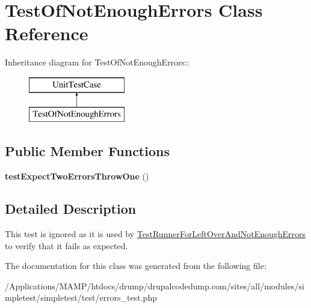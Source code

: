 \hypertarget{class_test_of_not_enough_errors}{
\section{TestOfNotEnoughErrors Class Reference}
\label{class_test_of_not_enough_errors}
}
Inheritance diagram for TestOfNotEnoughErrors::\begin{figure}[H]
\begin{center}
\leavevmode
\includegraphics[height=2cm]{class_test_of_not_enough_errors}
\end{center}
\end{figure}
\subsection*{Public Member Functions}
\begin{DoxyCompactItemize}
\item 
\hypertarget{class_test_of_not_enough_errors_a9a348adb703a7f8a550b2ff5465d55b7}{
{\bfseries testExpectTwoErrorsThrowOne} ()}
\label{class_test_of_not_enough_errors_a9a348adb703a7f8a550b2ff5465d55b7}

\end{DoxyCompactItemize}


\subsection{Detailed Description}
This test is ignored as it is used by \hyperlink{class_test_runner_for_left_over_and_not_enough_errors}{TestRunnerForLeftOverAndNotEnoughErrors} to verify that it fails as expected.

The documentation for this class was generated from the following file:\begin{DoxyCompactItemize}
\item 
/Applications/MAMP/htdocs/drump/drupalcodedump.com/sites/all/modules/simpletest/simpletest/test/errors\_\-test.php\end{DoxyCompactItemize}
